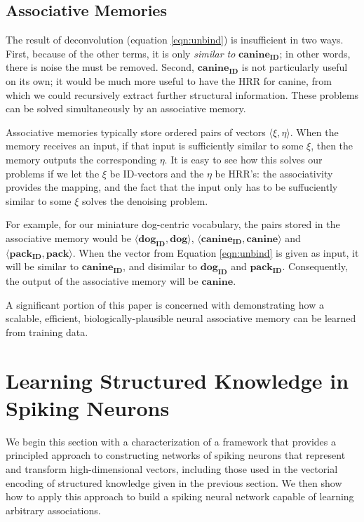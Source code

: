 \documentclass[10pt,letterpaper]{article}
\begin{document}
\subsection{Associative Memories}
The result of deconvolution (equation \eqref{eqn:unbind}) is insufficient in two ways. First, because of the other terms, it is only \textit{similar to} $\mathbf{canine_{ID}}$; in other words, there is noise the must be removed. Second, $\mathbf{canine_{ID}}$ is not particularly useful on its own; it would be much more useful to have the HRR for canine, from which we could recursively extract further structural information. These problems can be solved simultaneously by an associative memory.

Associative memories typically store ordered pairs of vectors $\langle\xi, \eta\rangle$. When the memory receives an input, if that input is sufficiently similar to some $\xi$, then the memory outputs the corresponding $\eta$. It is easy to see how this solves our problems if we let the $\xi$ be ID-vectors and the $\eta$ be HRR's: the associativity provides the mapping, and the fact that the input only has to be suffuciently similar to some $\xi$ solves the denoising problem. 

For example, for our miniature dog-centric vocabulary, the pairs stored in the associative memory would be $\langle\mathbf{dog_{ID}}, \mathbf{dog}\rangle$, $\langle\mathbf{canine_{ID}}, \mathbf{canine}\rangle$ and $\langle\mathbf{pack_{ID}}, \mathbf{pack}\rangle$. When the vector from Equation \eqref{eqn:unbind} is given as input, it will be similar to $\mathbf{canine_{ID}}$, and disimilar to $\mathbf{dog_{ID}}$ and $\mathbf{pack_{ID}}$. Consequently, the output of the associative memory will be $\mathbf{canine}$.

A significant portion of this paper is concerned with demonstrating how a scalable, efficient, biologically-plausible neural associative memory can be learned from training data.

\section{Learning Structured Knowledge in Spiking Neurons}
We begin this section with a characterization of a framework that provides a principled approach to constructing networks of spiking neurons that represent and transform high-dimensional vectors, including those used in the vectorial encoding of structured knowledge given in the previous section. We then show how to apply this approach to build a spiking neural network capable of learning arbitrary associations.
\end{document}
